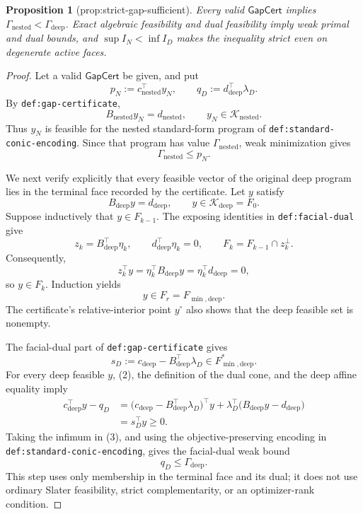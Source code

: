 \documentclass{article}
\newtheorem{proposition}{Proposition}
\begin{document}
\begin{proposition}[prop:strict-gap-sufficient]\label{prop:strict-gap-sufficient}
Every valid \(\mathsf{GapCert}\) implies \(\Gamma_{\mathrm{nested}}<\Gamma_{\mathrm{deep}}\). Exact algebraic feasibility and dual feasibility imply weak primal and dual bounds, and \(\sup I_N<\inf I_D\) makes the inequality strict even on degenerate active faces.
\end{proposition}
\begin{proof}
Let a valid \(\mathsf{GapCert}\) be given, and put
\[
 p_N:=c_{\mathrm{nested}}^{\top}y_N,
 \qquad
 q_D:=d_{\mathrm{deep}}^{\top}\lambda_D.
\]
By \texttt{def:gap-certificate},
\[
 B_{\mathrm{nested}}y_N=d_{\mathrm{nested}},
 \qquad y_N\in\mathcal K_{\mathrm{nested}}.
\]
Thus \(y_N\) is feasible for the nested standard-form program of
\texttt{def:standard-conic-encoding}.  Since that program has value
\(\Gamma_{\mathrm{nested}}\), weak minimization gives
\[
 \Gamma_{\mathrm{nested}}\leq p_N. \tag{1}
\]

We next verify explicitly that every feasible vector of the original deep
program lies in the terminal face recorded by the certificate.  Let \(y\)
satisfy
\[
 B_{\mathrm{deep}}y=d_{\mathrm{deep}},
 \qquad y\in\mathcal K_{\mathrm{deep}}=F_0.
\]
Suppose inductively that \(y\in F_{k-1}\).  The exposing identities in
\texttt{def:facial-dual} give
\[
 z_k=B_{\mathrm{deep}}^{\top}\eta_k,
 \qquad d_{\mathrm{deep}}^{\top}\eta_k=0,
 \qquad F_k=F_{k-1}\cap z_k^\perp.
\]
Consequently,
\[
 z_k^{\top}y
 =\eta_k^{\top}B_{\mathrm{deep}}y
 =\eta_k^{\top}d_{\mathrm{deep}}
 =0,
\]
so \(y\in F_k\).  Induction yields
\[
 y\in F_r=F_{\min,\mathrm{deep}}. \tag{2}
\]
The certificate's relative-interior point \(y^\circ\) also shows that the
deep feasible set is nonempty.

The facial-dual part of \texttt{def:gap-certificate} gives
\[
 s_D:=c_{\mathrm{deep}}-B_{\mathrm{deep}}^{\top}\lambda_D
 \in F_{\min,\mathrm{deep}}^*.
\]
For every deep feasible \(y\), (2), the definition of the dual cone, and the
deep affine equality imply
\[
 \begin{aligned}
 c_{\mathrm{deep}}^{\top}y-q_D
 &=\bigl(c_{\mathrm{deep}}-B_{\mathrm{deep}}^{\top}\lambda_D\bigr)^{\top}y
   +\lambda_D^{\top}
      \bigl(B_{\mathrm{deep}}y-d_{\mathrm{deep}}\bigr)\\
 &=s_D^{\top}y\geq0.
 \end{aligned} \tag{3}
\]
Taking the infimum in (3), and using the objective-preserving encoding in
\texttt{def:standard-conic-encoding}, gives the facial-dual weak bound
\[
 q_D\leq\Gamma_{\mathrm{deep}}. \tag{4}
\]
This step uses only membership in the terminal face and its dual; it does not
use ordinary Slater feasibility, strict complementarity, or an optimizer-rank
condition.


\end{proof}
\end{document}

